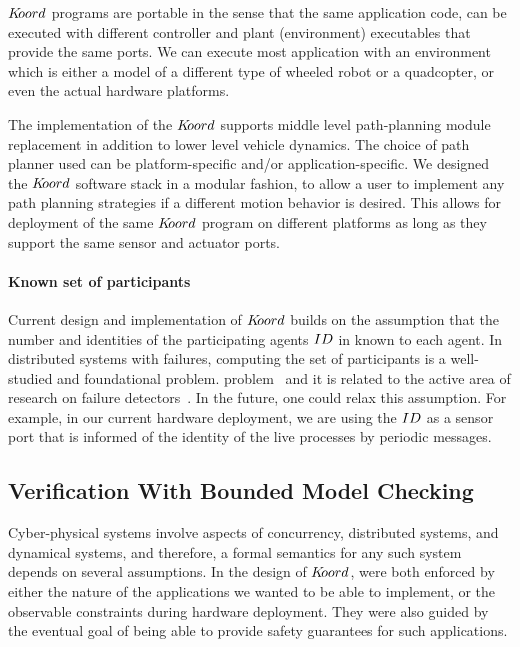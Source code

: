 $K\kern-2pt oord$ programs are portable in the sense that the same application code, can be executed with different controller and plant (environment) executables that provide the same ports. We can execute most application with an environment which is either a model of a different type of wheeled robot or a quadcopter, or even the actual hardware platforms. 

The implementation of the $K\kern-2pt oord$ supports middle level path-planning module replacement in addition to lower level vehicle dynamics. The  choice of path planner  used  can  be  platform-specific  and/or  application-specific. We designed the $K\kern-2pt oord$ software stack in a modular fashion, to allow a user to implement any path planning strategies if a different motion behavior is desired. This allows for deployment of the same $K\kern-2pt oord$ program on different platforms as long as they support the same sensor and actuator ports. 

\paragraph*{Known set of participants}
Current design and implementation of $K\kern-2pt oord$ builds on the assumption that the number and identities of the participating agents $ID$ in known to each agent. In distributed systems with failures, computing the set of participants is a well-studied and foundational problem. problem~\cite{AlistarhAGG2011} and it is related to the active area of research on failure detectors~\cite{Chandra:1996,delporte2004weakest}. In the future, one could  relax this  assumption. For example, in our current hardware deployment, we are using the $ID$ as a sensor port that is informed of the identity of the live processes by periodic messages. 

\subsection{Verification With Bounded Model Checking}
Cyber-physical systems involve aspects of concurrency, distributed systems, and dynamical systems, and therefore, a formal semantics for any such system depends on several assumptions. In the design of $K\kern-2pt oord$, were both enforced by either the nature of the applications we wanted to be able to implement, or the observable constraints during hardware deployment. They were also guided by the eventual goal of being able to provide safety guarantees for such applications.


